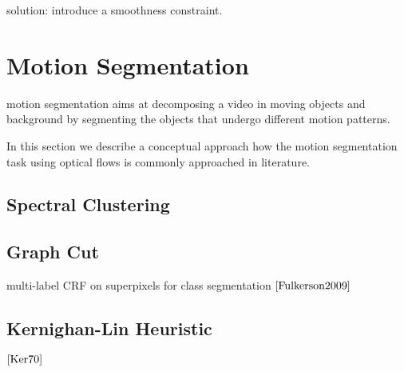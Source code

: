 solution: introduce a smoothness constraint.


\section{Motion Segmentation}
motion segmentation aims at decomposing a video in moving objects and background by segmenting the objects that undergo different motion patterns.

In this section we describe a conceptual approach how the motion segmentation task using optical flows is commonly approached in literature. 

\subsection{Spectral Clustering}
\subsection{Graph Cut}

multi-label CRF on superpixels for class segmentation $\cite{Fulkerson2009}$

\subsection{Kernighan-Lin Heuristic}


$\cite{Ker70}$
